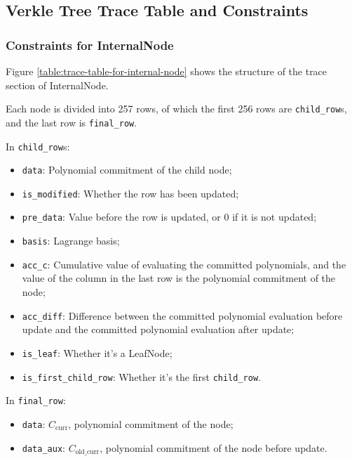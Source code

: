 \subsection{Verkle Tree Trace Table and Constraints}

\subsubsection{Constraints for InternalNode}

Figure \ref{table:trace-table-for-internal-node} shows the structure of the trace section of InternalNode.



Each node is divided into 257 rows, of which the first 256 rows are \verb|child_row|s, and the last row is \verb|final_row|.

In \verb|child_row|s:
\begin{itemize}
    \item \verb|data|: Polynomial commitment of the child node;
    \item \verb|is_modified|: Whether the row has been updated;
    \item \verb|pre_data|: Value before the row is updated, or 0 if it is not updated;
    \item \verb|basis|: Lagrange basis;
    \item \verb|acc_c|: Cumulative value of evaluating the committed polynomials, and the value of the column in the last row is the polynomial commitment of the node;
    \item \verb|acc_diff|: Difference between the committed polynomial evaluation before update and the committed polynomial evaluation after update;
    \item \verb|is_leaf|: Whether it's a LeafNode;
    \item \verb|is_first_child_row|: Whether it's the first \verb|child_row|.
\end{itemize}

In \verb|final_row|:
\begin{itemize}
    \item \verb|data|: $C_\text{curr}$, polynomial commitment of the node;
    \item \verb|data_aux|: $C_\text{old\_curr}$, polynomial commitment of the node before update.
\end{itemize}

